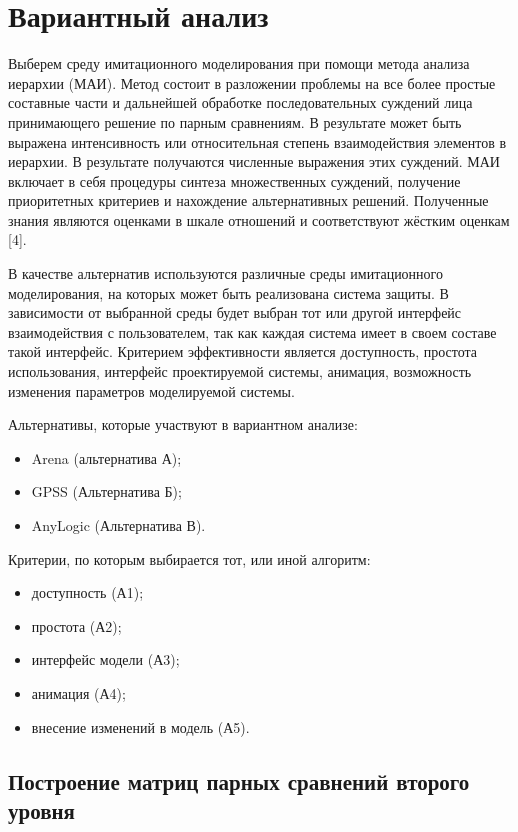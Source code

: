 \section{Вариантный анализ}

Выберем среду имитационного моделирования при помощи метода анализа иерархии (МАИ).
Метод состоит в разложении проблемы на все более простые составные части и дальнейшей обработке последовательных суждений лица принимающего решение по парным сравнениям.
В результате может быть выражена интенсивность или относительная степень взаимодействия элементов в иерархии.
В результате получаются численные выражения этих суждений.
МАИ включает в себя процедуры синтеза множественных суждений, получение приоритетных критериев и нахождение альтернативных решений.
Полученные знания являются оценками в шкале отношений и соответствуют жёстким оценкам [4].

В качестве альтернатив используются различные среды имитационного моделирования, на которых может быть реализована система защиты.
В зависимости от выбранной среды будет выбран тот или другой интерфейс взаимодействия с пользователем, так как каждая система имеет в своем составе такой интерфейс.
Критерием эффективности является доступность, простота использования, интерфейс проектируемой системы, анимация, возможность изменения параметров моделируемой системы.

Альтернативы, которые участвуют в вариантном анализе:
\begin{itemize}
  \item Arena (альтернатива А);
  \item GPSS (Альтернатива Б);
  \item AnyLogic (Альтернатива В).
\end{itemize}

Критерии, по которым выбирается тот, или иной алгоритм:
\begin{itemize}
  \item доступность (А1);
  \item простота (А2);
  \item интерфейс модели (А3);
  \item анимация (А4);
  \item внесение изменений в модель (А5).
\end{itemize}

\subsection{Построение матриц парных сравнений второго уровня}

